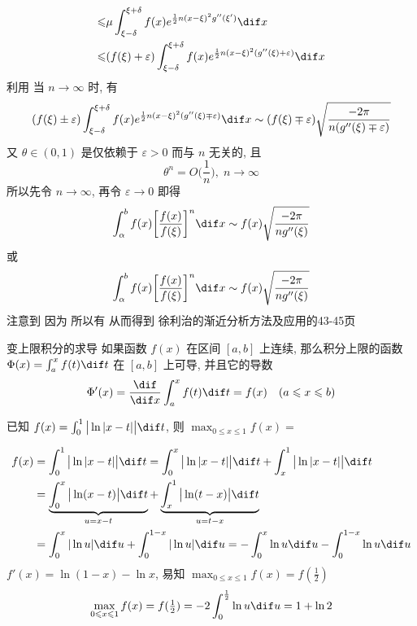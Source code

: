 \documentclass[color=green,titlestyle=hang]{elegantbook}%
\begin{document}
\begin{newproof}
\begin{align*}
\leqslant& \mu\int_{\xi-\delta}^{\xi+\delta}f(x)e^{\frac{1}{2}n(x-\xi)^2g''(\xi')}\dif x\\
\leqslant&(f(\xi)+\varepsilon)\int_{\xi-\delta}^{\xi+\delta}f(x)e^{\frac{1}{2}n(x-\xi)^2(g''(\xi)+\varepsilon)}\dif x
\end{align*}
利用  当 $n\to\infty$ 时, 有
\[(f(\xi)\pm\varepsilon)\int_{\xi-\delta}^{\xi+\delta}f(x)e^{\frac{1}{2}n(x-\xi)^2(g''(\xi)\mp\varepsilon)}\dif x\sim(f(\xi)\mp\varepsilon)\sqrt{\frac{-2\pi}{n(g''(\xi)\mp\varepsilon)}}\]
又 $\theta\in(0,1)$ 是仅依赖于 $\varepsilon>0$ 而与 $n$ 无关的, 且
\[\theta^n=O\Big(\frac{1}{n}\Big),\;n\to\infty \]
所以先令 $n\to\infty$, 再令 $\varepsilon\to0$ 即得
\[\int_{\alpha}^bf(x)\bigg[\frac{f(x)}{f(\xi)}\bigg]^n\dif x\sim f(x)\sqrt{\frac{-2\pi}{ng''(\xi)}} \]
或\[\int_{\alpha}^bf(x)\bigg[\frac{f(x)}{f(\xi)}\bigg]^n\dif x\sim f(x)\sqrt{\frac{-2\pi}{ng''(\xi)}} \]
注意到
因为  所以有
从而得到
徐利治的渐近分析方法及应用的43-45页	
\end{newproof}

\begin{theorem}{变上限积分的求导}{}
如果函数 $f(x)$ 在区间 $[a,b]$ 上连续, 那么积分上限的函数 $\Phi(x)=\int_a^xf(t)\dif t$ 在 $[a,b]$ 上可导, 并且它的导数
\[\Phi'(x)=\frac{\dif}{\dif x}\int_a^xf(t)\dif t=f(x)\quad(a\leqslant x\leqslant b) \]
\end{theorem}

\begin{example}
已知 $f(x)=\int_0^1\big|\ln|x-t|\big|\dif t$, 则 $\max_{0\leqslant x\leqslant1}f(x)=$
\end{example}\begin{solution}
\begin{align*}
f(x)&=\int_0^1\big|\ln|x-t|\big|\dif t=\int_0^x\big|\ln|x-t|\big|\dif t+\int_x^1\big|\ln|x-t|\big|\dif t\\
&=\underbrace{\int_0^x\big|\ln(x-t)\big|\dif t}_{u=x-t}+\underbrace{\int_x^1\big|\ln(t-x)\big|\dif t}_{u=t-x}\\
&=\int_0^x|\ln u|\dif u+\int_0^{1-x}|\ln u|\dif u=-\int_0^x\ln u\dif u-\int_0^{1-x}\ln u\dif u
\end{align*}
$f'(x)=\ln(1-x)-\ln x$, 易知 $\max_{0\leqslant x\leqslant1}f(x)=f(\tfrac{1}{2})$
\[\max_{0\leqslant x\leqslant1}f(x)=f(\tfrac{1}{2})=-2\int_0^{\frac{1}{2}}\ln u\dif u=1+\ln2\]
\end{solution}
\end{document}

